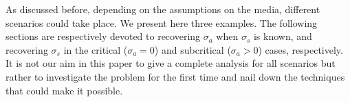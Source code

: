 \documentclass[english,reqno]{amsart}
\theoremstyle{plain}
\theoremstyle{definition} %
\newcommand{\rd}{\mathrm{d}}
\newcommand{\ql}[1]{\textcolor{blue}{\textbf{QL: #1}}}
\begin{document}
As discussed before, depending on the assumptions on the media, different scenarios could take place. We present here three examples. The following sections are respectively devoted to recovering $\sigma_a$ when $\sigma_s$ is known, and recovering $\sigma_s$ in the critical ($\sigma_a = 0$) and subcritical ($\sigma_a >0$) cases, respectively. It is not our aim in this paper to give a complete analysis for all scenarios but rather to investigate the problem for the first time and nail down the techniques that could make it possible.



\end{document}
